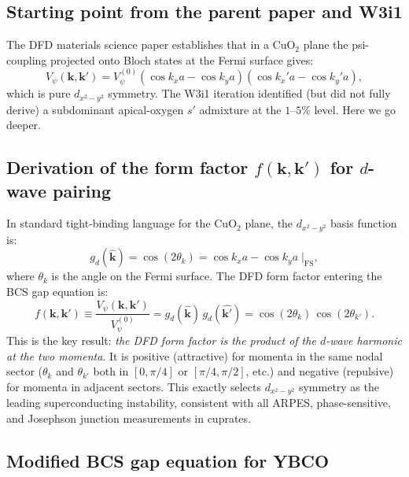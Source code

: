 \documentclass[11pt]{article}
\begin{document}
\subsection{Starting point from the parent paper and W3i1}

The DFD materials science paper establishes that in a CuO$_2$ plane the
psi-coupling projected onto Bloch states at the Fermi surface gives:
\begin{equation}
V_\psi(\mathbf{k},\mathbf{k}') = V_\psi^{(0)}
  (\cos k_x a - \cos k_y a)(\cos k_x' a - \cos k_y' a),
\label{eq:Vpsi-d}
\end{equation}
which is pure $d_{x^2-y^2}$ symmetry. The W3i1 iteration identified (but
did not fully derive) a subdominant apical-oxygen $s'$ admixture at the
$1$--$5\%$ level. Here we go deeper.

\subsection{Derivation of the form factor $f(\mathbf{k},\mathbf{k}')$
for $d$-wave pairing}

In standard tight-binding language for the CuO$_2$ plane, the
$d_{x^2-y^2}$ basis function is:
\begin{equation}
g_d(\hat{\mathbf{k}}) = \cos(2\theta_k) = \cos k_x a - \cos k_y a
  \;\big|_{\text{FS}},
\label{eq:gd}
\end{equation}
where $\theta_k$ is the angle on the Fermi surface. The DFD form
factor entering the BCS gap equation is:
\begin{equation}
f(\mathbf{k},\mathbf{k}') \equiv
  \frac{V_\psi(\mathbf{k},\mathbf{k}')}{V_\psi^{(0)}}
= g_d(\hat{\mathbf{k}})\,g_d(\hat{\mathbf{k}'})
= \cos(2\theta_k)\,\cos(2\theta_{k'}).
\label{eq:form-factor}
\end{equation}
This is the key result: \emph{the DFD form factor is the product of the
$d$-wave harmonic at the two momenta}. It is positive (attractive) for
momenta in the same nodal sector ($\theta_k$ and $\theta_{k'}$ both in
$[0,\pi/4]$ or $[\pi/4,\pi/2]$, etc.) and negative (repulsive) for
momenta in adjacent sectors. This exactly selects $d_{x^2-y^2}$ symmetry
as the leading superconducting instability, consistent with all ARPES,
phase-sensitive, and Josephson junction measurements in cuprates.

\subsection{Modified BCS gap equation for YBCO}
\end{document}

